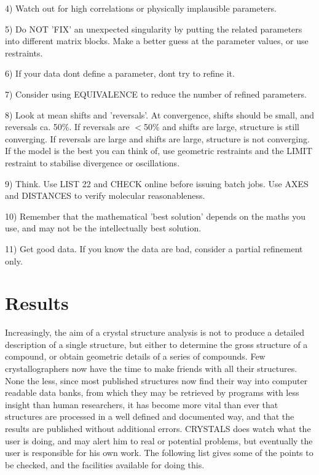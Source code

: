 \documentclass[10pt,a4paper]{report}
\begin{document}
 4) Watch out for high correlations or physically implausible parameters.



 5) Do NOT 'FIX' an unexpected singularity by putting the related parameters 
   into different matrix blocks. Make a better guess at the parameter values, 
   or use restraints.



 6) If your data dont define a parameter, dont try to refine it.



 7) Consider using EQUIVALENCE to reduce the number of refined parameters.



 8) Look at mean shifts and 'reversals'. At convergence, shifts should be 
   small, and reversals ca. 50\%. If reversals are $<$50\% and shifts are large, 
   structure is still converging. If reversals are large and shifts are 
   large, structure is not converging. If the model is the best you can think 
   of, use geometric restraints and the LIMIT restraint to stabilise 
   divergence or oscillations.



 9)  Think. Use LIST 22 and CHECK online before issuing batch jobs. Use AXES
    and DISTANCES to verify molecular reasonableness.



 10) Remember that the mathematical 'best solution' depends on the maths you 
    use, and may not be the intellectually best solution.



 11) Get good data. If you know the data are bad, consider a partial refinement
    only.



\chapter{Results}


Increasingly, the aim of a crystal structure analysis is not to produce a detailed description of a single structure, but either to determine the gross structure of a compound, or obtain geometric details of a series of compounds.  Few crystallographers now have the time to make friends with all their structures. None the less, since most published structures now find their way into computer readable data banks, from which they may be retrieved by programs with less insight than human researchers, it has become more vital than ever that structures are processed in a well defined and documented way, and that the results are published without additional errors. CRYSTALS does watch what the user is doing, and may alert him to real or potential problems, but eventually the user is responsible for his own work. The following list gives some of the points to be checked, and the facilities available for doing this.
\end{document}
